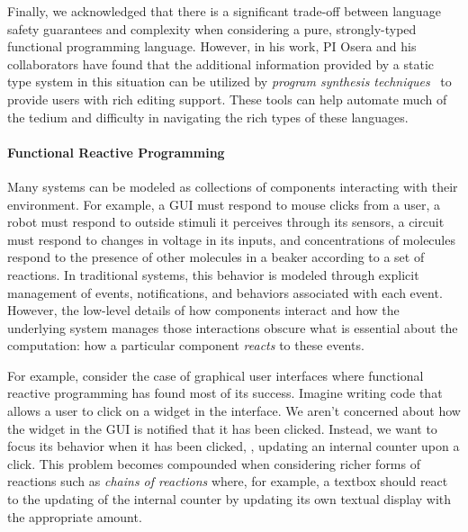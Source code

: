Finally, we acknowledged that there is a significant trade-off between language safety guarantees and complexity when considering a pure, strongly-typed functional programming language.
However, in his work, PI Osera and his collaborators have found that the additional information provided by a static type system in this situation can be utilized by \emph{program synthesis techniques}~\cite{osera:thesis:2015} to provide users with rich editing support.
These tools can help automate much of the tedium and difficulty in navigating the rich types of these languages.

\paragraph{Functional Reactive Programming}

Many systems can be modeled as collections of components interacting with their environment.
For example, a GUI must respond to mouse clicks from a user, a robot must respond to outside stimuli it perceives through its sensors, a circuit must respond to changes in voltage in its inputs, and concentrations of molecules respond to the presence of other molecules in a beaker according to a set of reactions.
In traditional systems, this behavior is modeled through explicit management of events, notifications, and behaviors associated with each event.
However, the low-level details of how components interact and how the underlying system manages those interactions obscure what is essential about the computation: how a particular component \emph{reacts} to these events.

For example, consider the case of graphical user interfaces where functional reactive programming has found most of its success.
Imagine writing code that allows a user to click on a widget in the interface.
We aren't concerned about how the widget in the GUI is notified that it has been clicked.
Instead, we want to focus its behavior when it has been clicked, \eg, updating an internal counter upon a click.
This problem becomes compounded when considering richer forms of reactions such as \emph{chains of reactions} where, for example, a textbox should react to the updating of the internal counter by updating its own textual display with the appropriate amount.

